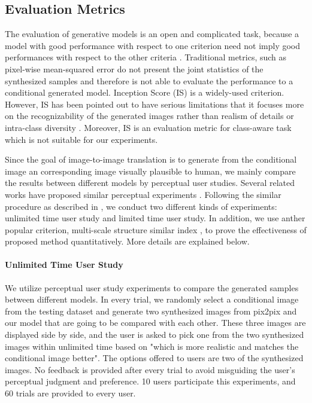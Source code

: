 \subsection{ Evaluation Metrics}
\label{subsec:evaluation}
The evaluation of generative models is an open and complicated task, because a model with good performance with respect to one criterion need not imply good performances with respect to the other criteria \cite{evaluation, GANs_equal}. Traditional metrics, such as pixel-wise mean-squared error do not present the joint statistics of the synthesized samples and therefore is not able to evaluate the performance to a conditional generated model. 
Inception Score (IS) \cite{Improved_Techniques} is a widely-used criterion. However, IS has been pointed out to have serious limitations that it focuses more on the recognizability of the generated images rather than realism of details or intra-class diversity \cite{evaluation}. Moreover, IS is an evaluation metric for class-aware task which is not suitable for our experiments.
 
Since the goal of image-to-image translation is to generate from the conditional image an corresponding image visually plausible to human, we mainly compare the results between different models by perceptual user studies. Several related works have proposed similar perceptual experiments \cite{LaplaceGANs, SRGANs, Improved_Techniques, CRN, pix2pixHD}. Following the similar procedure as described in \cite{CRN}, we conduct two different kinds of experiments: unlimited time user study and limited time user study. 
In addition, we use anther popular criterion, multi-scale structure similar index \cite{FID}, to prove the effectiveness of proposed method quantitatively. More details are explained below.
\paragraph{Unlimited Time User Study}
We utilize perceptual user study experiments to compare the generated samples between different models. In every trial, we randomly select a conditional image from the testing dataset and generate two synthesized images from pix2pix and our model that are going to be compared with each other. These three images are displayed side by side, and the user is asked to pick one from the two synthesized images within unlimited time based on "which is more realistic and matches the conditional image better". The options offered to users are two of the synthesized images. No feedback is provided after every trial to avoid misguiding the user's perceptual judgment and preference. 10 users participate this experiments, and 60 trials are provided to every user. 

